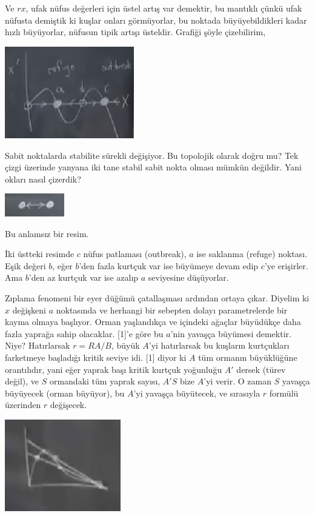 \documentclass[12pt,fleqn]{article}\usepackage{../../common}
\begin{document}
Ve $rx$, ufak nüfus değerleri için üstel artış var demektir, bu mantıklı çünkü
ufak nüfusta demiştik ki kuşlar onları görmüyorlar, bu noktada büyüyebildikleri
kadar hızlı büyüyorlar, nüfusun tipik artışı üsteldir. Grafiği şöyle
çizebilirim,

\includegraphics[height=4cm]{04_09.png}

Sabit noktalarda stabilite sürekli değişiyor. Bu topolojik olarak doğru mu? Tek
çizgi üzerinde yanyana iki tane stabil sabit nokta olması mümkün değildir. Yani
okları nasıl çizerdik?

\includegraphics[height=1cm]{04_10.png}

Bu anlamsız bir resim. 

İki üstteki resimde $c$ nüfus patlaması (outbreak), $a$ ise saklanma (refuge)
noktası. Eşik değeri $b$, eğer $b$'den fazla kurtçuk var ise büyümeye devam edip
$c$'ye erişirler. Ama $b$'den az kurtçuk var ise azalıp $a$ seviyesine düşüyorlar.

Zıplama fenomeni bir eyer düğümü çatallaşması ardından ortaya çıkar. Diyelim ki
$x$ değişkeni $a$ noktasında ve herhangi bir sebepten dolayı parametrelerde bir
kayma olmaya başlıyor. Orman yaşlandıkça ve içindeki ağaçlar büyüdükçe daha
fazla yaprağa sahip olacaklar. [1]'e göre bu $a$'nin yavaşça büyümesi
demektir. Niye? Hatırlarsak $r = RA / B$, büyük $A$'yi hatırlarsak bu kuşların
kurtçukları farketmeye başladığı kritik seviye idi. [1] diyor ki $A$ tüm ormanın
büyüklüğüne orantılıdır, yani eğer yaprak başı kritik kurtçuk yoğunluğu $A'$
dersek (türev değil), ve $S$ ormandaki tüm yaprak sayısı, $A' S$ bize $A$'yi
verir. O zaman $S$ yavaşça büyüyecek (orman büyüyor), bu $A$'yi yavaşça
büyütecek, ve sırasıyla $r$ formülü üzerinden $r$ değişecek.

\includegraphics[height=4cm]{04_11.png}
\end{document}
